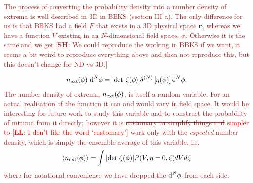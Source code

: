 \documentclass[12pt]{article}
\newcommand{\lfl}[1]{\textcolor{red}{[{\bf LL}: #1]}}
\newcommand{\SH}[1]{\textcolor{brown}{[{\bf SH}: #1]}}
\newcommand{\sh}[1]{\textcolor{brown}{#1}}
\newcommand{\LFL}[1]{\textcolor{red}{#1}}
\begin{document}
\sh{The process of converting the probability density into a number density of extrema is well described in 3D in BBKS \cite{BBKS} (section III a). The only difference for us is that BBKS had a field $F$ that exists in a 3D physical space ${\bf r}$, whereas we have a function $V$ existing in an $N$-dimensional field space, $\phi$. Otherwise it is the same and we get} \SH{We could reproduce the working in BBKS if we want, it seems a bit weird to reproduce everything above and then not reproduce this, but this doesn't change for ND vs 3D.}

\begin{equation}
n_{\rm ext}(\phi) \,\,{\rm d}^N \phi= |{\rm det}\,\, \zeta(\phi)| \delta^{(N)}\left[ \eta(\phi)\right] {\rm d}^N \phi.
\end{equation}
%
\sh{The number density of extrema, $n_{\rm ext}(\phi)$, is itself a random variable. For an actual realisation of the function it can and would vary in field space. It would be interesting for future work to study this variable and to construct the probability of minima from it directly; however it is \sout{customary to simplify things and} \LFL{simpler to} \lfl{I don't like the word `customary'} work only with the \emph{expected} number density, which is simply the ensemble average of this variable, i.e.}
\begin{equation} \label{NumberDensity}
\langle n_{\rm ext}(\phi)  \rangle= \int |{\rm det}\,\, \zeta(\phi)| P(V,\eta=0,\zeta)dV d\zeta
\end{equation}
\sh{where for notational convenience we have dropped the ${\rm d}^N \phi$ from each side.}
\end{document}
